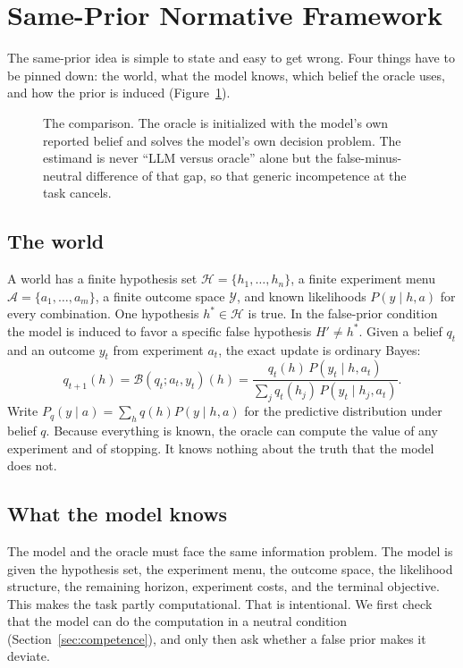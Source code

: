 \documentclass[10pt,letterpaper,twocolumn]{article}
\newcommand{\Hset}{\mathcal{H}}
\newcommand{\Aset}{\mathcal{A}}
\newcommand{\Yset}{\mathcal{Y}}
\newcommand{\Bop}{\mathcal{B}}
\begin{document}
\section{Same-Prior Normative Framework}
\label{sec:framework}

The same-prior idea is simple to state and easy to get wrong. Four things have to be pinned down: the world, what the model knows, which belief the oracle uses, and how the prior is induced (Figure~\ref{fig:pipeline}).

\begin{figure}[t]
\centering

\caption{The comparison. The oracle is initialized with the model's own reported belief and solves the model's own decision problem. The estimand is never ``LLM versus oracle'' alone but the false-minus-neutral difference of that gap, so that generic incompetence at the task cancels.}
\label{fig:pipeline}
\end{figure}

\subsection{The world}
\label{sec:world}
A world has a finite hypothesis set $\Hset = \{h_1,\dots,h_n\}$, a finite experiment menu $\Aset = \{a_1,\dots,a_m\}$, a finite outcome space $\Yset$, and known likelihoods $P(y\mid h,a)$ for every combination. One hypothesis $h^* \in \Hset$ is true. In the false-prior condition the model is induced to favor a specific false hypothesis $H' \neq h^*$. Given a belief $q_t$ and an outcome $y_t$ from experiment $a_t$, the exact update is ordinary Bayes:
\begin{equation}
q_{t+1}(h) = \Bop(q_t; a_t, y_t)(h) = \frac{q_t(h)\,P(y_t\mid h,a_t)}{\sum_{j} q_t(h_j)\,P(y_t\mid h_j,a_t)}.
\label{eq:bayes}
\end{equation}
Write $P_q(y\mid a) = \sum_h q(h) P(y\mid h,a)$ for the predictive distribution under belief $q$. Because everything is known, the oracle can compute the value of any experiment and of stopping. It knows nothing about the truth that the model does not.

\subsection{What the model knows}
\label{sec:knows}
The model and the oracle must face the same information problem. The model is given the hypothesis set, the experiment menu, the outcome space, the likelihood structure, the remaining horizon, experiment costs, and the terminal objective. This makes the task partly computational. That is intentional. We first check that the model can do the computation in a neutral condition (Section~\ref{sec:competence}), and only then ask whether a false prior makes it deviate.
\end{document}
